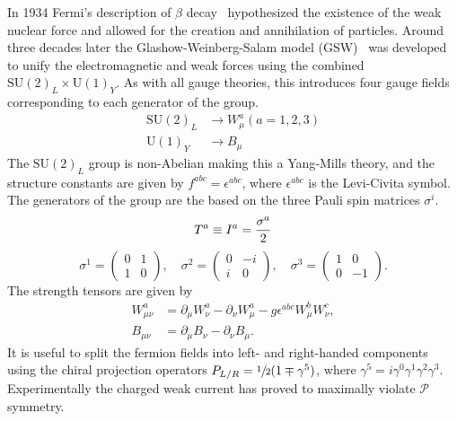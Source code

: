 In 1934 Fermi's description of $\beta$ decay~\cite{Fermi1934} hypothesized the existence of the weak nuclear force and allowed for the creation and annihilation of particles.
Around three decades later the Glashow-Weinberg-Salam model (GSW)~\cite{Glashow1961, Weinberg1967,Salam1964} was developed to unify the electromagnetic and weak forces using the combined $\text{SU}(2)_L \times \text{U}(1)_Y$.
As with all gauge theories, this introduces four gauge fields corresponding to each generator of the group.
\begin{align}
    \text{SU}(2)_L & \rightarrow W_\mu^a(a = 1, 2, 3) \\
    \text{U}(1)_Y  & \rightarrow B_\mu
\end{align}
The $\text{SU}(2)_L$ group is non-Abelian making this a Yang-Mills theory, and the structure constants are given by $f^{abc} = \epsilon^{abc}$, where $\epsilon^{abc}$ is the Levi-Civita symbol.
The generators of the group are the based on the three Pauli spin matrices $\sigma^i$.
\begin{equation}
    \label{eq:su2_generators}
    T^a \equiv I^a = \frac{\sigma^a}{2} \\
\end{equation}
\begin{equation}
    \sigma^1 = \begin{pmatrix} 0 & 1 \\ 1 & 0 \end{pmatrix},
    \quad \sigma^2 = \begin{pmatrix} 0 & -i \\ i & 0 \end{pmatrix},
    \quad \sigma^3 = \begin{pmatrix} 1 & 0 \\ 0 & -1 \end{pmatrix}.
    \label{eq:pauli_matrices}
\end{equation}
The strength tensors are given by
\begin{align}
    \label{eq:ew_field_strength_tensors}
    W_{\mu\nu}^a & = \partial_\mu W_\nu^a - \partial_\nu W_\mu^a - g \epsilon^{abc} W_\mu^b W_\nu^c, \\
    B_{\mu\nu}   & = \partial_\mu B_\nu - \partial_\nu B_\mu.
\end{align}
It is useful to split the fermion fields into left- and right-handed components using the chiral projection operators $P_{L/R} = \sfrac{1}{2} (1 \mp \gamma^5)$, where $\gamma^5 = i \gamma^0 \gamma^1 \gamma^2 \gamma^3$.
Experimentally the charged weak current has proved to maximally violate $\mathcal{P}$ symmetry.
